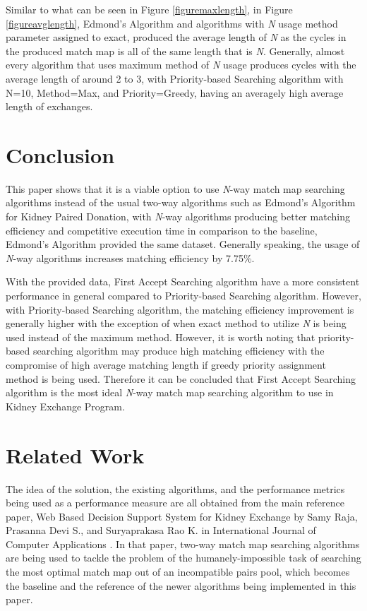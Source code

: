 \documentclass[conference]{IEEEtran}
\begin{document}
Similar to what can be seen in Figure \ref{figuremaxlength}, in Figure \ref{figureavglength}, Edmond's Algorithm and algorithms with
\textit{N} usage method parameter assigned to exact, produced the average length of \textit{N} as the cycles in the produced match map is all
of the same length that is \textit{N}. Generally, almost every algorithm that uses maximum method of \textit{N} usage produces cycles with the
average length of around 2 to 3, with Priority-based Searching algorithm with N=10, Method=Max, and Priority=Greedy, having an averagely high
average length of exchanges.

\section{Conclusion}
This paper shows that it is a viable option to use \textit{N}-way match map searching algorithms instead of the usual two-way
algorithms such as Edmond's Algorithm for Kidney Paired Donation, with \textit{N}-way algorithms producing better matching efficiency
and competitive execution time in comparison to the baseline, Edmond's Algorithm provided the same dataset. Generally speaking,
the usage of \textit{N}-way algorithms increases matching efficiency by 7.75\%.

With the provided data, First Accept Searching algorithm have a more consistent performance in general compared to Priority-based Searching
algorithm. However, with Priority-based Searching algorithm, the matching efficiency improvement is generally higher with the exception of
when exact method to utilize \textit{N} is being used instead of the maximum method. However, it is worth noting that priority-based searching
algorithm may produce high matching efficiency with the compromise of high average matching length if greedy priority assignment method is being
used. Therefore it can be concluded that First Accept Searching algorithm is the most ideal \textit{N}-way match map searching algorithm to use
in Kidney Exchange Program. 

\section{Related Work}
The idea of the solution, the existing algorithms, and the performance metrics being used as a performance measure are all obtained from
the main reference paper, Web Based Decision Support System for Kidney Exchange by Samy Raja, Prasanna Devi S., and Suryaprakasa Rao K. in
International Journal of Computer Applications \cite{raja}. In that paper, two-way match map searching algorithms are being used to tackle
the problem of the humanely-impossible task of searching the most optimal match map out of an incompatible pairs pool, which becomes the baseline
and the reference of the newer algorithms being implemented in this paper.
\end{document}
